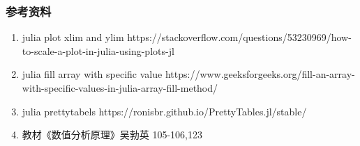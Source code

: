 \documentclass[11pt]{article}
\providecommand{\tightlist}{%
      \setlength{\itemsep}{0pt}\setlength{\parskip}{0pt}}
\begin{document}
    \hypertarget{ux53c2ux8003ux8d44ux6599}{%
\subsubsection{参考资料}\label{ux53c2ux8003ux8d44ux6599}}

\begin{enumerate}
\def\labelenumi{\arabic{enumi}.}
\tightlist
\item
  julia plot xlim and ylim
  https://stackoverflow.com/questions/53230969/how-to-scale-a-plot-in-julia-using-plots-jl
\item
  julia fill array with specific value
  https://www.geeksforgeeks.org/fill-an-array-with-specific-values-in-julia-array-fill-method/
\item
  julia prettytabels https://ronisbr.github.io/PrettyTables.jl/stable/
\item
  教材《数值分析原理》吴勃英 105-106,123
\end{enumerate}


    
    
    
\end{document}
